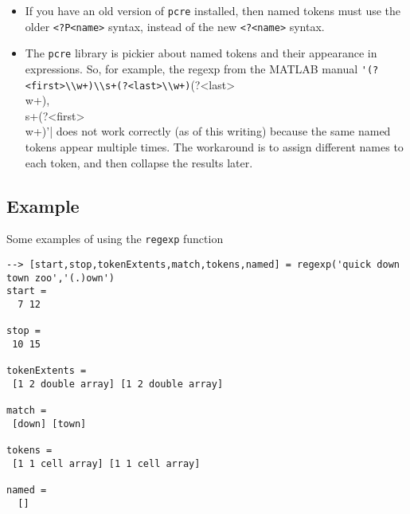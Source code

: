 \begin{itemize}
\item  If you have an old version of \verb|pcre| installed, then named tokens must use the
older \verb|<?P<name>| syntax, instead of the new \verb|<?<name>| syntax.  

\item  The \verb|pcre| library is pickier about named tokens and their appearance in 
expressions.  So, for example, the regexp from the MATLAB 
manual \verb|'(?<first>\\w+)\\s+(?<last>\\w+)|(?<last>\\w+),\\s+(?<first>\\w+)'|
does not work correctly (as of this writing) because the same named 
tokens appear multiple
times.  The workaround is to assign different names to each token, and then collapse
the results later.

\end{itemize}
\subsection{Example}

Some examples of using the \verb|regexp| function
\begin{verbatim}
--> [start,stop,tokenExtents,match,tokens,named] = regexp('quick down town zoo','(.)own')
start = 
  7 12 

stop = 
 10 15 

tokenExtents = 
 [1 2 double array] [1 2 double array] 

match = 
 [down] [town] 

tokens = 
 [1 1 cell array] [1 1 cell array] 

named = 
  []
\end{verbatim}
